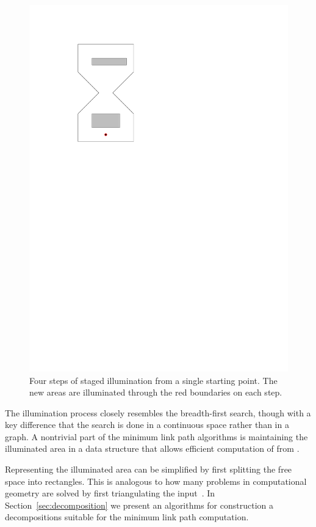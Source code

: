\documentclass[english,gradu]{tktltiki2018}
\begin{document}
\begin{figure}
	\includegraphics[scale=0.5,page=4]{fig/staged}
	\caption{Four steps of staged illumination from a single starting point. The new areas are illuminated through the red boundaries on each step.}\label{fig:staged}
\end{figure}

The illumination process closely resembles the breadth-first search, though with a key difference that the search is done in a continuous space rather than in a graph.
A nontrivial part of the minimum link path algorithms is maintaining the illuminated area in a data structure that allows efficient computation of  from .

Representing the illuminated area can be simplified by first splitting the free space into rectangles.
This is analogous to how many problems in computational geometry are solved by first triangulating the input~\cite{handbook}.
In Section~\ref{sec:decomposition} we present an algorithms for construction a decompositions suitable for the minimum link path computation.
\end{document}
